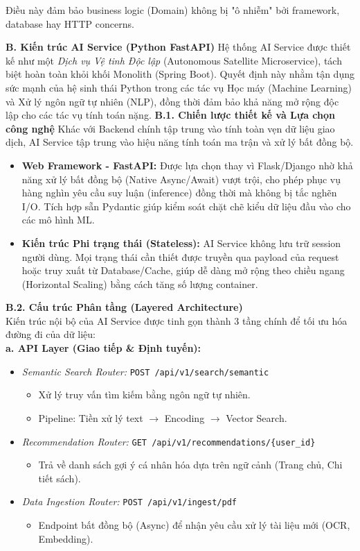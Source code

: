 Điều này đảm bảo business logic (Domain) không bị "ô nhiễm" bởi framework, database hay HTTP concerns.




\textbf{B. Kiến trúc AI Service (Python FastAPI)}
Hệ thống AI Service được thiết kế như một \textit{Dịch vụ Vệ tinh Độc lập} (Autonomous Satellite Microservice), tách biệt hoàn toàn khỏi khối Monolith (Spring Boot). Quyết định này nhằm tận dụng sức mạnh của hệ sinh thái Python trong các tác vụ Học máy (Machine Learning) và Xử lý ngôn ngữ tự nhiên (NLP), đồng thời đảm bảo khả năng mở rộng độc lập cho các tác vụ tính toán nặng.
\textbf{B.1. Chiến lược thiết kế và Lựa chọn công nghệ}
Khác với Backend chính tập trung vào tính toàn vẹn dữ liệu giao dịch, AI Service tập trung vào hiệu năng tính toán ma trận và xử lý bất đồng bộ.
\begin{itemize}
\item \textbf{Web Framework - FastAPI:} Được lựa chọn thay vì Flask/Django nhờ khả năng xử lý bất đồng bộ (Native Async/Await) vượt trội, cho phép phục vụ hàng nghìn yêu cầu suy luận (inference) đồng thời mà không bị tắc nghẽn I/O. Tích hợp sẵn Pydantic giúp kiểm soát chặt chẽ kiểu dữ liệu đầu vào cho các mô hình ML.
\item \textbf{Kiến trúc Phi trạng thái (Stateless):} AI Service không lưu trữ session người dùng. Mọi trạng thái cần thiết được truyền qua payload của request hoặc truy xuất từ Database/Cache, giúp dễ dàng mở rộng theo chiều ngang (Horizontal Scaling) bằng cách tăng số lượng container.
\end{itemize}
\textbf{B.2. Cấu trúc Phân tầng (Layered Architecture)} \\ 
Kiến trúc nội bộ của AI Service được tinh gọn thành 3 tầng chính để tối ưu hóa đường đi của dữ liệu: \\
\textbf{a. API Layer (Giao tiếp \& Định tuyến):}
\begin{itemize}
\item \textit{Semantic Search Router:} \texttt{POST /api/v1/search/semantic}
\begin{itemize}
\item Xử lý truy vấn tìm kiếm bằng ngôn ngữ tự nhiên.
\item Pipeline: Tiền xử lý text $\rightarrow$ Encoding $\rightarrow$ Vector Search.
\end{itemize}
\item \textit{Recommendation Router:} \texttt{GET /api/v1/recommendations/\{user\_id\}}
\begin{itemize}
\item Trả về danh sách gợi ý cá nhân hóa dựa trên ngữ cảnh (Trang chủ, Chi tiết sách).
\end{itemize}
\item \textit{Data Ingestion Router:} \texttt{POST /api/v1/ingest/pdf}
\begin{itemize}
\item Endpoint bất đồng bộ (Async) để nhận yêu cầu xử lý tài liệu mới (OCR, Embedding).
\end{itemize}
\end{itemize}
